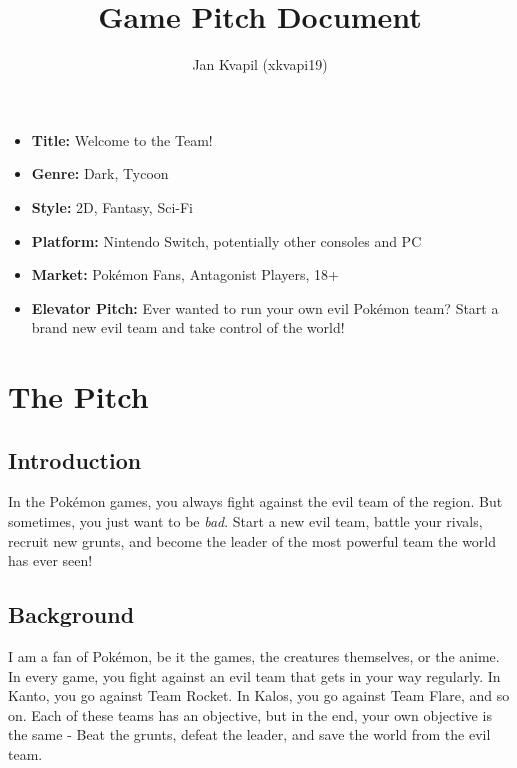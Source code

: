 \documentclass[a4paper,10pt,english]{article}
\title{%
Game Pitch Document%
}
\author{%
Jan Kvapil (xkvapi19)%
}
\date{}
\begin{document}
\maketitle
\thispagestyle{empty}

{%
\large

\begin{itemize}

\item[] \textbf{Title:} Welcome to the Team!

\item[] \textbf{Genre:} Dark, Tycoon

\item[] \textbf{Style:} 2D, Fantasy, Sci-Fi

\item[] \textbf{Platform:} Nintendo Switch, potentially other consoles and PC

\item[] \textbf{Market:} Pokémon Fans, Antagonist Players, 18+

\item[] \textbf{Elevator Pitch:} Ever wanted to run your own evil Pokémon team? Start a brand new evil team and take control of the world!

\end{itemize}

}

\section*{\centering The Pitch}

\subsection*{Introduction}

In the Pokémon games, you always fight against the evil team of the region. But sometimes, you just want to be \textit{bad}. Start a new evil team, battle your rivals, recruit new grunts, and become the leader of the most powerful team the world has ever seen! 

\subsection*{Background}


I am a fan of Pokémon, be it the games, the creatures themselves, or the anime. In every game, you fight against an evil team that gets in your way regularly. In Kanto, you go against Team Rocket. In Kalos, you go against Team Flare, and so on. Each of these teams has an objective, but in the end, your own objective is the same - Beat the grunts, defeat the leader, and save the world from the evil team. 
\end{document}
